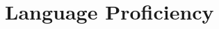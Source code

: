 \documentclass[%
               doublesided,
               paper=a4,
               fontsize=10.5pt
              ]{my-resume}
\begin{document}
{    \section{Language Proficiency}
  
    

    

    
    
    



    

}
\end{document}
